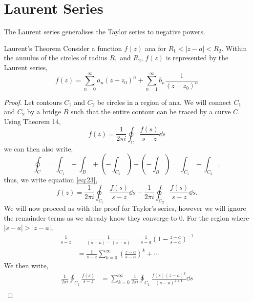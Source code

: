 \documentclass{book}
\begin{document}
\section{Laurent Series}
The Laurent series generalises the Taylor series to negative powers. 
\begin{Theorems}{Laurent's Theorem}{}
	Consider a function $f(z)$ ana for $R_1 < |z - a| < R_2$. Within the annulus of the circles of radius $R_1$ and $R_2$, $f(z)$ is represented by the Laurent series,
	\begin{equation}
		f(z) = \sum_{n=0}^{\infty}a_n(z-z_0)^n + \sum_{n=1}^{\infty}b_n	\frac{1}{(z-z_0)^n}
	\end{equation}
\end{Theorems}
\begin{proof}
	Let contours $C_1$ and $C_2$ be circles in a region of ana. We will connect $C_1$ and $C_2$ by a bridge $B$ such that the entire contour can be traced by a curve $C$. Using Theorem 14, 
	\begin{equation}
		f(z) = \frac{1}{2\pi i}\oint_C \frac{f(s)}{s - z}\dd{s} \label{eq:23}
	\end{equation}
	we can then also write,
	\begin{equation}
		\oint_C = \int_{C_1} + \int_B + \left(-\int_{C_2}\right) + (-\int_B) = \int_{C_1} - \int_{C_2},
	\end{equation}
	thus, we write equation \eqref{eq:23},
	\begin{equation}
		f(z) = \frac{1}{2\pi i}\oint_{C_1}\frac{f(s)}{s - z}\dd{s} -\frac{1}{2\pi i}\oint_{C_2}\frac{f(s)}{s-z}\dd{s}.
	\end{equation}
	We will now proceed as with the proof for Taylor's series, however we will ignore the remainder terms as we already know they converge to 0. For the region where $|s - a| > |z - a|$,
	\begin{equation}
		\begin{split}
			\frac{1}{s - z} &= \frac{1}{(s - a)-(z-a)} = \frac{1}{s - a}\left(1 - \frac{z -a}{s-a}\right)^{-1} \\
			& = \frac{1}{s-z}\sum_{k=0}^{\infty}\left(\frac{z-a}{s-a}\right)^k + \cdots
		\end{split}
	\end{equation}
	We then write,
	\begin{equation}
		\begin{split}
		\frac{1}{2\pi i }\oint_{C_1} \frac{f(s)}{s-z} &= \sum_{k=0}^{\infty}\frac{1}{2\pi i}\oint_{C_1}\frac{f(s)(z-a)^k}{(s-a)^{k+1}}\dd{s} \\

\end{split}
\end{equation}
\end{proof}
\end{document}
